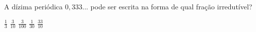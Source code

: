 A dízima periódica $0{,}333...$ pode ser escrita na forma de qual fração irredutível?

$\frac{1}{3}$
$\frac{3}{10}$
$\frac{3}{100}$
$\frac{1}{30}$
$\frac{33}{10}$



